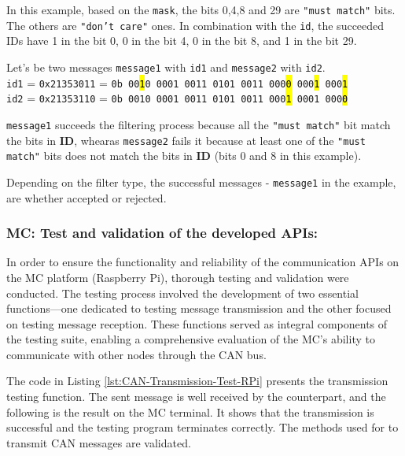 In this example, based on the \texttt{mask}, the bits 0,4,8 and 29 are \texttt{"must match"} bits. The others are \texttt{"don't care"} ones.
In combination with the \texttt{id}, the succeeded IDs have 1 in the bit 0, 0 in the bit 4, 0 in the bit 8, and 1 in the bit 29.

Let's be two messages \texttt{message1} with \texttt{id1} and \texttt{message2} with \texttt{id2}. \\
\texttt{id1} = \texttt{0x21353011} = \texttt{0b 00\hl{1}0 0001 0011 0101 0011 000\hl{0} 000\hl{1} 000\hl{1}} \\
\texttt{id2} = \texttt{0x21353110} = \texttt{0b 0010 0001 0011 0101 0011 000\hl{1} 0001 000\hl{0}}

\texttt{message1} succeeds the filtering process because all the \texttt{"must match"} bit match the bits in \textbf{ID}, whearas \texttt{message2} fails it because at least one of the \texttt{"must match"} bits does not match the bits in \textbf{ID} (bits 0 and 8 in this example).

Depending on the filter type, the successful messages - \texttt{message1} in the example, are whether accepted or rejected.



\subsubsection{MC: Test and validation of the developed APIs:}

In order to ensure the functionality and reliability of the communication APIs on the MC platform (Raspberry Pi), thorough testing and validation were conducted. The testing process involved the development of two essential functions—one dedicated to testing message transmission and the other focused on testing message reception. These functions served as integral components of the testing suite, enabling a comprehensive evaluation of the MC's ability to communicate with other nodes through the CAN bus.

The code in Listing \ref{lst:CAN-Transmission-Test-RPi} presents the transmission testing function. The sent message is well received by the counterpart, and the following is the result on the MC terminal. It shows that the transmission is successful and the testing program terminates correctly. The methods used for to transmit CAN messages are validated.


